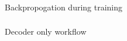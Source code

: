 		




			
			
		



			
			
		



			
			


\begin{frame}[fragile]\frametitle{}
\begin{center}
{\Large Backpropogation during training}
\end{center}
\end{frame}

\begin{frame}[fragile]\frametitle{}
\begin{center}
{\Large Decoder only workflow}
\end{center}
\end{frame}
